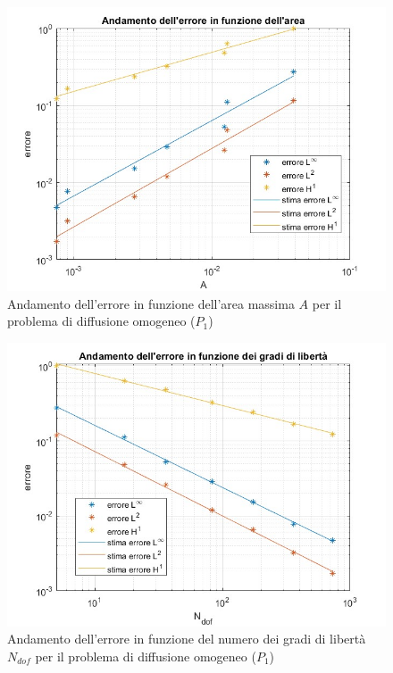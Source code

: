 \documentclass[%
	corpo=11pt,
    twoside,
    stile=classica,
    oldstyle,
    tipotesi=custom,
    greek,
    evenboxes,
]{toptesi}
\begin{document}
    \begin{figure}[htbp]
  \centering
    \includegraphics[scale=0.4]{Pictures/errore_area_p1_omog.jpg}
    \caption{Andamento dell'errore in funzione dell'area massima $A$ per il problema di diffusione omogeneo ($P_1$)}
    \label{fig:p1_area}
    \end{figure}
    
    \begin{figure}[htbp]
  \centering
    \includegraphics[scale=0.4]{Pictures/errore_gdl_p1_omog.jpg}
    \caption{Andamento dell'errore in funzione del numero dei gradi di libertà $N_{dof}$ per il problema di diffusione omogeneo ($P_1$)}
    \label{fig:p1_gdl}
    \end{figure}
\end{document}
